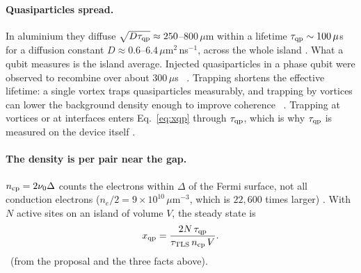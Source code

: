 \paragraph{Quasiparticles spread.} In aluminium they diffuse $\sqrt{D\tau_{\rm qp}}\approx250$--$800\,\mu$m within a lifetime $\tau_{\rm qp}\sim100\,\mu$s for a diffusion constant
$D\approx0.6$--$6.4\,\mu$m$^2$\,ns$^{-1}$, across the whole island \calc. What a qubit measures is the island average. Injected quasiparticles in a phase qubit were observed to recombine over about 300\,$\mu$s~\cite{Lenander2011} \observed. Trapping
shortens the effective lifetime: a single vortex traps quasiparticles measurably, and trapping by vortices can lower the background
density enough to improve coherence~\cite{Wang2014} \observed. Trapping at vortices or at interfaces enters Eq.~\eqref{eq:xqp} through
$\tau_{\rm qp}$, which is why $\tau_{\rm qp}$ is measured on the device itself \derived.
\paragraph{The density is per pair near the gap.} $n_{\rm cp}=2\nu_0\Delta$ counts the electrons within $\Delta$ of the Fermi surface, not all
conduction electrons ($n_e/2=9\times10^{10}\,\mu$m$^{-3}$, which is $22{,}600$ times larger) \calc.
With $N$ active sites on an island of volume $V$, the steady state is
\begin{equation}x_{\rm qp}=\frac{2N\,\tau_{\rm qp}}{\tau_{\rm TLS}\,n_{\rm cp}\,V}.\label{eq:xqp}\end{equation}
\derived\ (from the proposal and the three facts above).

